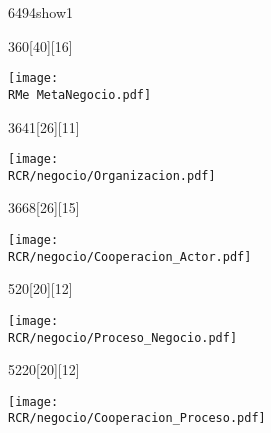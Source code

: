 \begin{NuevaPagina}{64}{94}{show1}
	\begin{NuevoParrafo}{36}{0}[40][16]
		\begin{Marco}[\LineaSupC][\LineaInfC][\LineaIzqC][\LineaDerC][CBlanco]
			\centering\texttt{[image: \\RMe MetaNegocio.pdf]}
		\end{Marco}
	\end{NuevoParrafo}
	
	\begin{NuevoParrafo}{36}{41}[26][11]
		\begin{Marco}[\LineaSupC][\LineaInfC][\LineaIzqC][\LineaDerC][CBlanco]
			\subseccionC{\PVOrg}%
			\centering\texttt{[image: \\RCR/negocio/Organizacion.pdf]}
		\end{Marco}
	\end{NuevoParrafo}
	
	\begin{NuevoParrafo}{36}{68}[26][15]
		\begin{Marco}[\LineaSupC][\LineaInfC][\LineaIzqC][\LineaDerC][CBlanco]
			\subseccionC{\PVCAc}%
			\centering\texttt{[image: \\RCR/negocio/Cooperacion\_Actor.pdf]}
		\end{Marco}
	\end{NuevoParrafo}
	
	\begin{NuevoParrafo}{52}{0}[20][12]
		\begin{Marco}[\LineaSupC][\LineaInfC][\LineaIzqC][\LineaDerC][CBlanco]
			\subseccionC{\PVPNe}%
			\centering\texttt{[image: \\RCR/negocio/Proceso\_Negocio.pdf]}
		\end{Marco}
	\end{NuevoParrafo}
	
	\begin{NuevoParrafo}{52}{20}[20][12]
		\begin{Marco}[\LineaSupC][\LineaInfC][\LineaIzqC][\LineaDerC][CBlanco]
			\subseccionC{\PVCPN}%
			\centering\texttt{[image: \\RCR/negocio/Cooperacion\_Proceso.pdf]}
		\end{Marco}
	\end{NuevoParrafo}
	

\end{NuevaPagina}
